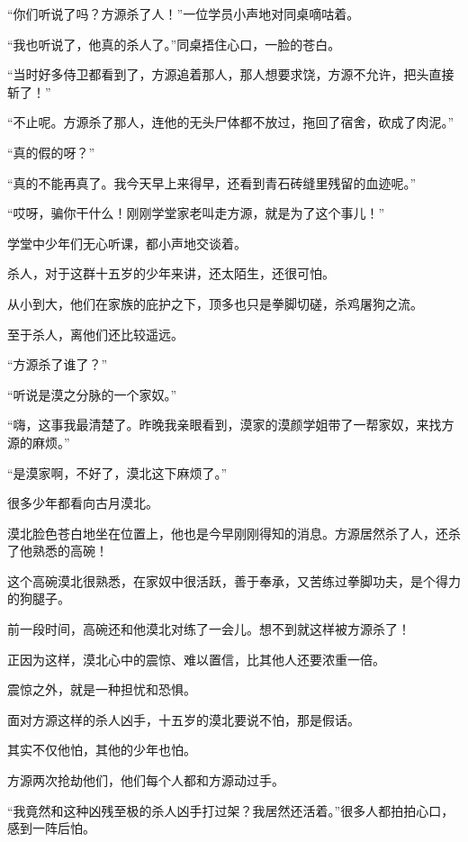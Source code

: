 
\begin{this_body}

“你们听说了吗？方源杀了人！”一位学员小声地对同桌嘀咕着。

“我也听说了，他真的杀人了。”同桌捂住心口，一脸的苍白。

“当时好多侍卫都看到了，方源追着那人，那人想要求饶，方源不允许，把头直接斩了！”

“不止呢。方源杀了那人，连他的无头尸体都不放过，拖回了宿舍，砍成了肉泥。”

“真的假的呀？”

“真的不能再真了。我今天早上来得早，还看到青石砖缝里残留的血迹呢。”

“哎呀，骗你干什么！刚刚学堂家老叫走方源，就是为了这个事儿！”

学堂中少年们无心听课，都小声地交谈着。

杀人，对于这群十五岁的少年来讲，还太陌生，还很可怕。

从小到大，他们在家族的庇护之下，顶多也只是拳脚切磋，杀鸡屠狗之流。

至于杀人，离他们还比较遥远。

“方源杀了谁了？”

“听说是漠之分脉的一个家奴。”

“嗨，这事我最清楚了。昨晚我亲眼看到，漠家的漠颜学姐带了一帮家奴，来找方源的麻烦。”

“是漠家啊，不好了，漠北这下麻烦了。”

很多少年都看向古月漠北。

漠北脸色苍白地坐在位置上，他也是今早刚刚得知的消息。方源居然杀了人，还杀了他熟悉的高碗！

这个高碗漠北很熟悉，在家奴中很活跃，善于奉承，又苦练过拳脚功夫，是个得力的狗腿子。

前一段时间，高碗还和他漠北对练了一会儿。想不到就这样被方源杀了！

正因为这样，漠北心中的震惊、难以置信，比其他人还要浓重一倍。

震惊之外，就是一种担忧和恐惧。

面对方源这样的杀人凶手，十五岁的漠北要说不怕，那是假话。

其实不仅他怕，其他的少年也怕。

方源两次抢劫他们，他们每个人都和方源动过手。

“我竟然和这种凶残至极的杀人凶手打过架？我居然还活着。”很多人都拍拍心口，感到一阵后怕。


\end{this_body}
